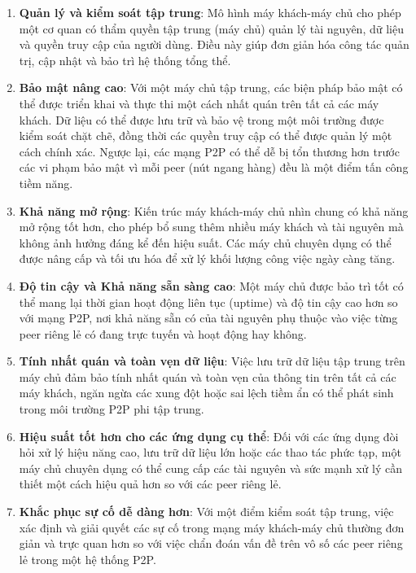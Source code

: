 \documentclass[a4paper, 15pt]{article}
\begin{document}
\begin{enumerate}
    \item \textbf{Quản lý và kiểm soát tập trung}:  
    Mô hình máy khách-máy chủ cho phép một cơ quan có thẩm quyền tập trung (máy chủ) quản lý tài nguyên, dữ liệu và quyền truy cập của người dùng. Điều này giúp đơn giản hóa công tác quản trị, cập nhật và bảo trì hệ thống tổng thể.
    
    \item \textbf{Bảo mật nâng cao}:  
    Với một máy chủ tập trung, các biện pháp bảo mật có thể được triển khai và thực thi một cách nhất quán trên tất cả các máy khách. Dữ liệu có thể được lưu trữ và bảo vệ trong một môi trường được kiểm soát chặt chẽ, đồng thời các quyền truy cập có thể được quản lý một cách chính xác. Ngược lại, các mạng P2P có thể dễ bị tổn thương hơn trước các vi phạm bảo mật vì mỗi peer (nút ngang hàng) đều là một điểm tấn công tiềm năng.
    
    \item \textbf{Khả năng mở rộng}:  
    Kiến trúc máy khách-máy chủ nhìn chung có khả năng mở rộng tốt hơn, cho phép bổ sung thêm nhiều máy khách và tài nguyên mà không ảnh hưởng đáng kể đến hiệu suất. Các máy chủ chuyên dụng có thể được nâng cấp và tối ưu hóa để xử lý khối lượng công việc ngày càng tăng.
    
    \item \textbf{Độ tin cậy và Khả năng sẵn sàng cao}:  
    Một máy chủ được bảo trì tốt có thể mang lại thời gian hoạt động liên tục (uptime) và độ tin cậy cao hơn so với mạng P2P, nơi khả năng sẵn có của tài nguyên phụ thuộc vào việc từng peer riêng lẻ có đang trực tuyến và hoạt động hay không.
    
    \item \textbf{Tính nhất quán và toàn vẹn dữ liệu}:  
    Việc lưu trữ dữ liệu tập trung trên máy chủ đảm bảo tính nhất quán và toàn vẹn của thông tin trên tất cả các máy khách, ngăn ngừa các xung đột hoặc sai lệch tiềm ẩn có thể phát sinh trong môi trường P2P phi tập trung.
    
    \item \textbf{Hiệu suất tốt hơn cho các ứng dụng cụ thể}:  
    Đối với các ứng dụng đòi hỏi xử lý hiệu năng cao, lưu trữ dữ liệu lớn hoặc các thao tác phức tạp, một máy chủ chuyên dụng có thể cung cấp các tài nguyên và sức mạnh xử lý cần thiết một cách hiệu quả hơn so với các peer riêng lẻ.
    
    \item \textbf{Khắc phục sự cố dễ dàng hơn}:  
    Với một điểm kiểm soát tập trung, việc xác định và giải quyết các sự cố trong mạng máy khách-máy chủ thường đơn giản và trực quan hơn so với việc chẩn đoán vấn đề trên vô số các peer riêng lẻ trong một hệ thống P2P.
\end{enumerate}
\end{document}
